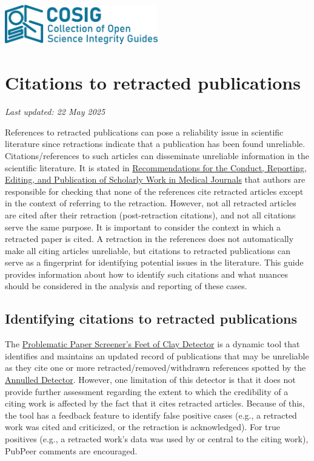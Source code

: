 \documentclass[letterpaper, 12pt]{article}
\begin{document}
\flushleft
\includegraphics[width=0.5\textwidth]{img/home/241017_final_logo_mockup.png}

\section*{Citations to retracted publications}
\textit{Last updated: 22 May 2025}

References to retracted publications can pose a reliability issue in scientific literature since retractions indicate that a publication has been found unreliable. Citations/references to such articles can disseminate unreliable information in the scientific literature. It is stated in \href{https://www.icmje.org/icmje-recommendations.pdf}{Recommendations for the Conduct, Reporting, Editing, and Publication of Scholarly Work in Medical Journals} that authors are responsible for checking that none of the references cite retracted articles except in the context of referring to the retraction. 
However, not all retracted articles are cited after their retraction (post-retraction citations), and not all citations serve the same purpose. It is important to consider the context in which a retracted paper is cited. A retraction in the references does not automatically make all citing articles unreliable, but citations to retracted publications can serve as a fingerprint for identifying potential issues in the literature. This guide provides information about how to identify such citations and what nuances should be considered in the analysis and reporting of these cases. 

\subsection*{Identifying citations to retracted publications}
The \href{https://dbrech.irit.fr/pls/apex/f?p=9999:31}{Problematic Paper Screener’s Feet of Clay Detector} is a dynamic tool that identifies and maintains an updated record of publications that may be unreliable as they cite one or more  retracted/removed/withdrawn references spotted by the \href{https://www.irit.fr/~Guillaume.Cabanac/problematic-paper-screener/annulled}{Annulled Detector}. However, one limitation of this detector is that it does not provide further assessment regarding the extent to which the credibility of a citing work is affected by the fact that it cites retracted articles. Because of this, the tool has a feedback feature to identify false positive cases (e.g., a retracted work was cited and criticized, or the retraction is acknowledged). For true positives (e.g., a retracted work’s data was used by or central to the citing work), PubPeer comments are encouraged. 
\end{document}

